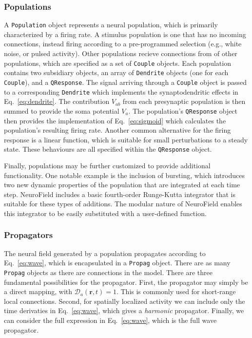 \documentclass[preprint,review,10pt,authoryear,letterpaper]{elsarticle}
\begin{document}
\subsubsection{Populations}
A \texttt{Population} object represents a neural population, which is primarily characterized by a firing rate. A stimulus population is one that has no incoming connections, instead firing according to a pre-programmed selection (e.g., white noise, or pulsed activity). Other populations recieve connections from of other populations, which are specified as a set of \texttt{Couple} objects. Each population contains two subsidiary objects, an array of \texttt{Dendrite} objects (one for each \texttt{Couple}), and a \texttt{QResponse}. The signal arriving through a \texttt{Couple} object is passed to a corresponding \texttt{Dendrite} which implements the synaptodendritic effects in Eq.~\eqref{eq:dendrite}. The contribution $V_{ab}$ from each presynaptic population is then summed to provide the soma potential $V_a$. The population's \texttt{QResponse} object then provides the implementation of Eq.~\ref{eq:sigmoid} which calculates the population's resulting firing rate. Another common alternative for the firing response is a linear function, which is suitable for small perturbations to a steady state. These behaviours are all specified within the \texttt{QResponse} object. 

Finally, populations may be further customized to provide additional functionality. One notable example is the inclusion of bursting, which introduces two new dynamic properties of the population that are integrated at each time step. NeuroField includes a basic fourth-order Runge-Kutta integrator that is suitable for these types of additions. The modular nature of NeuroField enables this integrator to be easily substituted with a user-defined function. 


\subsubsection{Propagators}
The neural field generated by a population propagates according to Eq.~\ref{eq:wave}, which is encapsulated in a \texttt{Propag} object. There are as many \texttt{Propag} objects as there are connections in the model. There are three fundamental possibilities for the propagator. First, the propagator may simply be a direct mapping, with $\mathcal{D}_a(\mathbf{r},t) = 1$. This is commonly used for short-range local connections. Second, for spatially localized activity we can include only the time derivaties in Eq.~\ref{eq:wave}, which gives a \emph{harmonic} propagator. Finally, we can consider the full expression in Eq.~\ref{eq:wave}, which is the full wave propagator.
\end{document}
